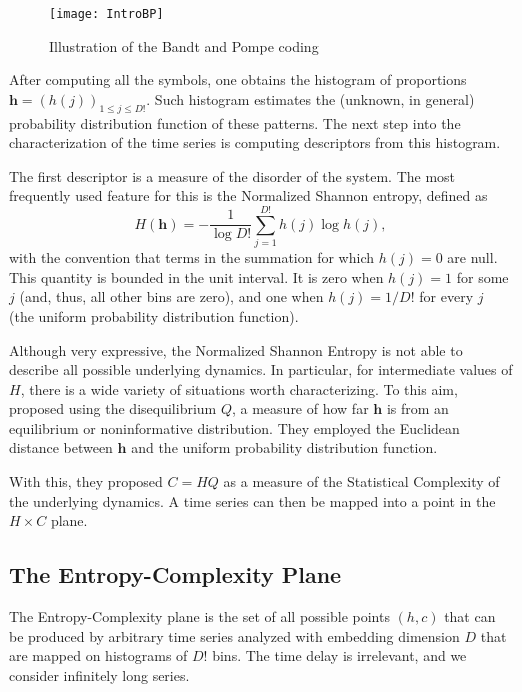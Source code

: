 \begin{figure}[hbt]
	\centering
	\texttt{[image: IntroBP]}
	\caption{Illustration of the Bandt and Pompe coding}
	\label{Fig:IntroBP}
\end{figure}

After computing all the symbols, one obtains the histogram of proportions $\bm h = (h(j))_{1\leq j\leq D!}$.
Such histogram estimates the (unknown, in general) probability distribution function of these patterns.
The next step into the characterization of the time series is computing descriptors from this histogram.

The first descriptor is a measure of the disorder of the system.
The most frequently used feature for this is the Normalized Shannon entropy, defined as
\begin{equation}
	H(\bm h) = -\frac{1}{\log D!} \sum_{j=1}^{D!} h(j) \log h(j),
\end{equation}
with the convention that terms in the summation for which $h(j)=0$ are null.
This quantity is bounded in the unit interval. 
It is zero when $h(j)=1$ for some $j$ (and, thus, all other bins are zero), and one when $h(j)=1/D!$ for every $j$ (the uniform probability distribution function).

Although very expressive, the Normalized Shannon Entropy is not able to describe all possible underlying dynamics.
In particular, for intermediate values of $H$, there is a wide variety of situations worth characterizing.
To this aim, \citet{LopezRuiz1995} proposed using the disequilibrium  $Q$, a measure of how far $\bm h$ is from an equilibrium or noninformative distribution.
They employed the Euclidean distance between $\bm h$ and the uniform probability distribution function.

With this, they proposed $C=HQ$ as a measure of the Statistical Complexity of the underlying dynamics.
A time series can then be mapped into a point in the $H\times C$ plane.

\subsection{The Entropy-Complexity Plane}\label{Sec:HCPlane}

The Entropy-Complexity plane is the set of all possible points $(h,c)$ that can be produced by arbitrary time series analyzed with embedding dimension $D$ that are mapped on histograms of $D!$ bins.
The time delay is irrelevant, and we consider infinitely long series.

